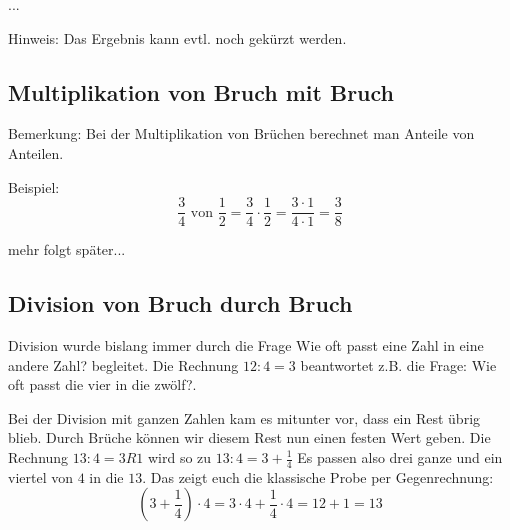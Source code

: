 ... 

Hinweis: Das Ergebnis kann evtl. noch gekürzt werden.

\subsection{Multiplikation von Bruch mit Bruch}

Bemerkung: Bei der Multiplikation von Brüchen berechnet man Anteile von Anteilen.

Beispiel:
\begin{equation*} 
	\frac{3}{4}\text{ von }\frac{1}{2} = \frac{3}{4} \cdot \frac{1}{2}= \frac{3\cdot 1}{4\cdot 1}= \frac{3}{8}
\end{equation*}

mehr folgt später... 

\subsection{Division von Bruch durch Bruch}\vspace{-1em}
Division wurde bislang immer durch die Frage \glqq{}Wie oft passt eine Zahl in eine andere Zahl?\grqq{} begleitet. 
Die Rechnung $12:4=3$ beantwortet z.B. die Frage: \glqq{}Wie oft passt die vier in die zwölf?\grqq{}.

Bei der Division mit ganzen Zahlen kam es mitunter vor, dass ein Rest übrig blieb. Durch Brüche können wir diesem Rest nun einen festen Wert geben. Die Rechnung 
$	13:4 = 3 R 1 $ wird so zu $13:4= 3+\frac{1}{4}$
Es passen also drei ganze und ein viertel von $4$ in die $13$. Das zeigt euch die klassische Probe per Gegenrechnung:
\begin{equation*}
	\left(3+\frac{1}{4}\right)\cdot 4 = 3\cdot 4 + \frac{1}{4}\cdot 4 = 12 + 1 = 13
\end{equation*}

